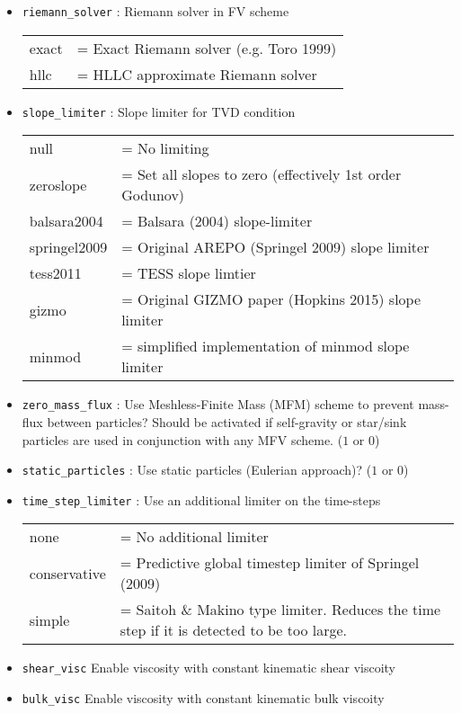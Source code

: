 \documentclass[a4paper]{article}
\newcommand{\var}[1]{\texttt{#1}}
\begin{document}
\begin{itemize}

\item \var{riemann\_solver} : Riemann solver in FV scheme \\
\begin{tabular}{ll}
exact  & = Exact Riemann solver (e.g. Toro 1999) \\
hllc & = HLLC approximate Riemann solver
\end{tabular}

\item \var{slope\_limiter} : Slope limiter for TVD condition \\
\begin{tabular}{ll}
null          & = No limiting \\
zeroslope     & = Set all slopes to zero (effectively 1st order Godunov) \\
balsara2004   & = Balsara (2004) slope-limiter \\
springel2009  & = Original AREPO (Springel 2009) slope limiter \\
tess2011      & = TESS slope limtier \\
gizmo         & = Original GIZMO paper (Hopkins 2015) slope limiter \\
minmod        & = simplified implementation of minmod slope limiter
\end{tabular}

\item \var{zero\_mass\_flux} : Use Meshless-Finite Mass (MFM) scheme to prevent mass-flux between particles?  Should be activated if self-gravity or star/sink particles are used in conjunction with any MFV scheme.  ($1$ or $0$)
\item \var{static\_particles} : Use static particles (Eulerian approach)?  ($1$ or $0$)

\item \var{time\_step\_limiter} : Use an additional limiter on the time-steps \\
\begin{tabular}{ll}
none		 & = No additional limiter \\
conservative & = Predictive global timestep limiter of Springel (2009) \\
simple		 & = Saitoh \& Makino type limiter. Reduces the time step if it is detected to be too large.
\end{tabular}

\item \var{shear\_visc} Enable viscosity with constant kinematic shear viscoity
\item \var{bulk\_visc}  Enable viscosity with constant kinematic bulk  viscoity

\end{itemize}
\end{document}
